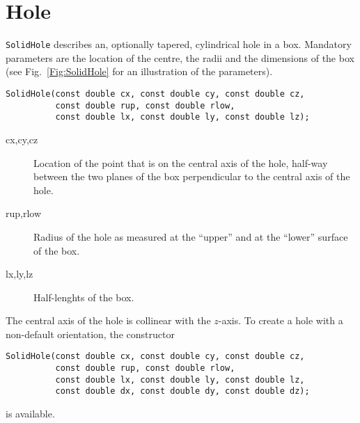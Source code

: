\section{Hole}
\texttt{SolidHole} describes an, optionally tapered, cylindrical hole 
in a box. Mandatory parameters are the location of the centre, 
the radii and the dimensions of the box (see Fig.~\ref{Fig:SolidHole} for 
an illustration of the parameters).
\begin{lstlisting}
SolidHole(const double cx, const double cy, const double cz,
          const double rup, const double rlow,
          const double lx, const double ly, const double lz);      
\end{lstlisting}
\begin{description}
  \item[cx,cy,cz] Location of the point that is on the central axis of the hole, half-way between the two planes of the box perpendicular to the central axis of the hole.
  \item[rup,rlow] Radius of the hole as measured at the ``upper'' and at the ``lower'' surface of the box.
  \item[lx,ly,lz] Half-lenghts of the box.
\end{description}
The central axis of the hole is collinear with the $z$-axis. 
To create a hole with a non-default orientation, the constructor
\begin{lstlisting}
SolidHole(const double cx, const double cy, const double cz,
          const double rup, const double rlow,
          const double lx, const double ly, const double lz,
          const double dx, const double dy, const double dz);
\end{lstlisting}
is available.
